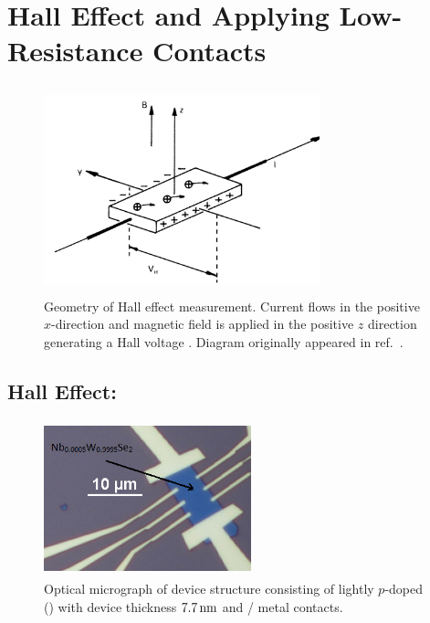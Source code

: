 \section{Hall Effect and Applying Low-Resistance Contacts}\label{sec:hall_effect_intro}
\begin{figure}[ht]
	\centering
	\includegraphics[height=6cm,width=8cm]{figs/results/hall_diagram}
	\caption[Hall effect measurement diagram]{Geometry of Hall effect measurement. Current flows in the positive $x$-direction and magnetic field is applied in the positive $z$ direction generating a Hall voltage \cite{HallEffectNIST}. Diagram originally appeared in ref.~\cite{HallDiagram}.}
	\label{fig:hall_diagram}
\end{figure}

\subsection{Hall Effect: \lightlyfive}\label{subsec:hall_lightly}
\begin{figure}[ht]
	\centering
	\includegraphics[height=4.5cm,width=6.0cm]{figs/results/hall_bar_doped_channel/hall_bar_device_pic_11192015_no2_doping_scheme}
	\caption[Hall bar device optical micrograph using \lightlyfive]{Optical micrograph of device structure consisting of lightly $p$-doped  (\lightlyfive) with device thickness $7.7\,\mathrm{nm}$ and / metal contacts.}
	\label{fig:hall_bar_device1}
\end{figure}

